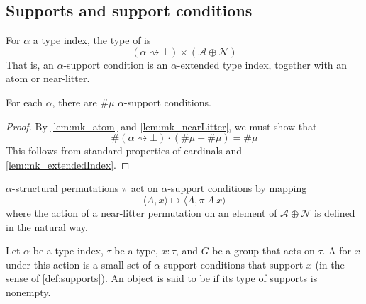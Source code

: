 \subsection{Supports and support conditions}

\begin{definition}
    For \( \alpha \) a type index, the type of  is
    \[ (\alpha \rightsquigarrow \bot) \times (\mathcal A \oplus \mathcal N) \]
    That is, an \( \alpha \)-support condition is an \( \alpha \)-extended type index, together with an atom or near-litter.
\end{definition}
\begin{lemma}
    \label{lem:mk_supportCondition}
    For each \( \alpha \), there are \( \#\mu \) \( \alpha \)-support conditions.
\end{lemma}
\begin{proof}
    By \cref{lem:mk_atom} and \cref{lem:mk_nearLitter}, we must show that
    \[ \#(\alpha \rightsquigarrow \bot) \cdot (\#\mu + \#\mu) = \#\mu \]
    This follows from standard properties of cardinals and \cref{lem:mk_extendedIndex}.
\end{proof}
\begin{definition}
    \( \alpha \)-structural permutations \( \pi \) act on \( \alpha \)-support conditions by mapping
    \[ \langle A, x \rangle \mapsto \langle A, \pi\ A\ x \rangle \]
    where the action of a near-litter permutation on an element of \( \mathcal A \oplus \mathcal N \) is defined in the natural way.
\end{definition}
\begin{definition}
    Let \( \alpha \) be a type index, \( \tau \) be a type, \( x : \tau \), and \( G \) be a group that acts on \( \tau \).
    A  for \( x \) under this action is a small set of \( \alpha \)-support conditions that support \( x \) (in the sense of \cref{def:supports}).
    An object is said to be  if its type of supports is nonempty.
\end{definition}
